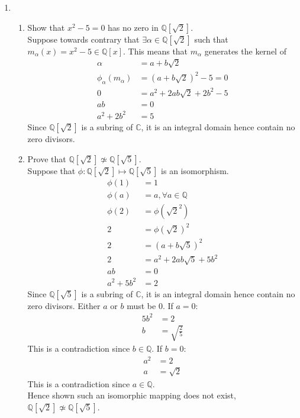 \documentclass[12pt]{article}
\begin{document}
\begin{enumerate}
	\item
		\begin{enumerate}
			\item Show that $x^2 - 5 = 0$ has no zero in $\mathbb{Q}[\sqrt{2}]$.\\
			Suppose towards contrary that $\exists \alpha \in \mathbb{Q}[\sqrt{2}]$
			such that $m_\alpha(x) = x^2-5 \in \mathbb{Q}[x]$. This means that
			$m_\alpha$ generates the kernel of 
			\begin{align*}
				\alpha &= a+b\sqrt{2}\\
				\phi_\alpha(m_\alpha) &= (a+b\sqrt{2})^2 -5=0\\
				0 &= a^2 + 2ab\sqrt{2} + 2b^2 - 5\\
				ab &= 0\\
				a^2 + 2b^2 &= 5
			\end{align*}
			Since $\mathbb{Q}[\sqrt{2}]$ is a subring of $\mathbb{C}$, it is an
				integral domain hence contain no zero divisors.
			\item Prove that $\mathbb{Q}[\sqrt{2}] \not\simeq \mathbb{Q}[\sqrt{5}]$.\\
				Suppose that $\phi : \mathbb{Q}[\sqrt{2}] \mapsto \mathbb{Q}[\sqrt{5}]$
				is an isomorphism. 
				\begin{align*}
				\phi(1) &= 1\\
				\phi(a) &= a, \forall a\in\mathbb{Q}\\
				\phi(2) &= \phi(\sqrt{2}^2)\\
							2 &= \phi(\sqrt{2})^2\\
							2 &= (a+b\sqrt{5})^2\\
							2 &= a^2 + 2ab\sqrt{5} + 5b^2\\
						 ab &= 0\\
		 a^2 + 5b^2 &= 2
				\end{align*}
			Since $\mathbb{Q}[\sqrt{5}]$ is a subring of $\mathbb{C}$, it is an
				integral domain hence contain no zero divisors. Either $a$ or $b$ must
				be $0$. If $a=0$:
				\begin{align*}
					5b^2 &= 2\\
					b &= \sqrt{\frac{2}{5}}
				\end{align*}
				This is a contradiction since $b \in \mathbb{Q}$. If $b=0$:
				\begin{align*}
					a^2 &= 2\\
					a &= \sqrt{2}
				\end{align*}
				This is a contradiction since $a \in \mathbb{Q}$.\\
				Hence shown such an isomorphic mapping does not exist,
				$\mathbb{Q}[\sqrt{2}] \not\simeq \mathbb{Q}[\sqrt{5}]$.
		\end{enumerate}


\end{enumerate}
\end{document}
